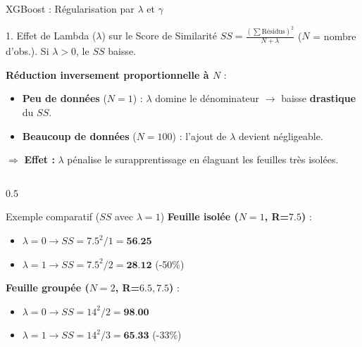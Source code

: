 \begin{frame}{XGBoost : Régularisation par $\lambda$ et $\gamma$}
    \vspace{-0.2cm}
    \begin{block}{1. Effet de Lambda ($\lambda$) sur le Score de Similarité}
        \scriptsize $SS = \frac{(\sum \text{Résidus})^2}{N + \lambda}$ \quad ($N$ = nombre d'obs.). Si $\lambda>0$, le $SS$ baisse.
        
        \textbf{Réduction inversement proportionnelle à $N$} :
        \begin{itemize}
            \setlength\itemsep{0em}
            \item \textbf{Peu de données} ($N=1$) : $\lambda$ domine le dénominateur $\rightarrow$ baisse \textbf{drastique} du $SS$.
            \item \textbf{Beaucoup de données} ($N=100$) : l'ajout de $\lambda$ devient négligeable.
        \end{itemize}
        $\Rightarrow$ \textbf{Effet :} $\lambda$ pénalise le surapprentissage en élaguant les feuilles très isolées.
    \end{block}

    \begin{columns}[T]
        \begin{column}{0.5\textwidth}
            \begin{block}{Exemple comparatif ($SS$ avec $\lambda=1$)}
                \scriptsize
                \textbf{Feuille isolée ($N=1$, R=$7.5$)} :
                \begin{itemize}
                    \setlength\itemsep{0em}
                    \item $\lambda=0 \rightarrow SS = 7.5^2 / 1 = \textbf{56.25}$
                    \item $\lambda=1 \rightarrow SS = 7.5^2 / 2 = \textbf{28.12}$ {\color{red} (-50\%)}
                \end{itemize}
                
                \textbf{Feuille groupée ($N=2$, R=$6.5, 7.5$)} :
                \begin{itemize}
                    \setlength\itemsep{0em}
                    \item $\lambda=0 \rightarrow SS = 14^2 / 2 = \textbf{98.00}$
                    \item $\lambda=1 \rightarrow SS = 14^2 / 3 = \textbf{65.33}$ {\color{red} (-33\%)}
                \end{itemize}
            \end{block}
        \end{column}
        

\end{columns}
\end{frame}
